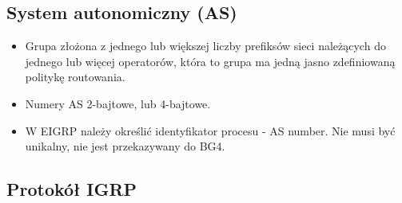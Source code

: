 \documentclass[../main.tex]{subfiles}
\begin{document}
    \subsection{System autonomiczny (AS)}
    \begin{itemize}
        \item Grupa złożona z jednego lub większej liczby prefiksów
        sieci należących do jednego lub więcej operatorów, która to grupa ma jedną jasno
        zdefiniowaną politykę routowania.
        \item Numery AS 2-bajtowe, lub 4-bajtowe.
        \item W EIGRP należy określić identyfikator procesu - AS number. Nie musi być unikalny, nie jest
        przekazywany do BG4.
    \end{itemize}


    \subsection{Protokół IGRP}
\end{document}
